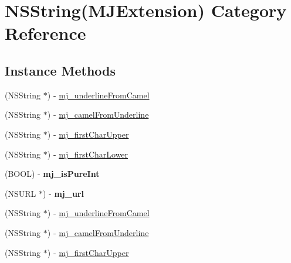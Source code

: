 \hypertarget{category_n_s_string_07_m_j_extension_08}{}\section{N\+S\+String(M\+J\+Extension) Category Reference}
\label{category_n_s_string_07_m_j_extension_08}
\subsection*{Instance Methods}
\begin{DoxyCompactItemize}
\item 
(N\+S\+String $\ast$) -\/ \mbox{\hyperlink{category_n_s_string_07_m_j_extension_08_ac826f205c48aad2a72f76041f472ec2f}{mj\+\_\+underline\+From\+Camel}}
\item 
(N\+S\+String $\ast$) -\/ \mbox{\hyperlink{category_n_s_string_07_m_j_extension_08_a6d1d7710a991b1745f21225f7beee34b}{mj\+\_\+camel\+From\+Underline}}
\item 
(N\+S\+String $\ast$) -\/ \mbox{\hyperlink{category_n_s_string_07_m_j_extension_08_af5a6d0a9c48a931b154a407715d0e4e9}{mj\+\_\+first\+Char\+Upper}}
\item 
(N\+S\+String $\ast$) -\/ \mbox{\hyperlink{category_n_s_string_07_m_j_extension_08_a4706ba52ea63138b268f17ceaee1bf38}{mj\+\_\+first\+Char\+Lower}}
\item 
\mbox{\label{category_n_s_string_07_m_j_extension_08_a3abd08e6e7a92ae537b8b10f6ebcad4c}} 
(B\+O\+OL) -\/ {\bfseries mj\+\_\+is\+Pure\+Int}
\item 
\mbox{\label{category_n_s_string_07_m_j_extension_08_a1a8cd87a9449a00dd961034ec7024154}} 
(N\+S\+U\+RL $\ast$) -\/ {\bfseries mj\+\_\+url}
\item 
(N\+S\+String $\ast$) -\/ \mbox{\hyperlink{category_n_s_string_07_m_j_extension_08_ac826f205c48aad2a72f76041f472ec2f}{mj\+\_\+underline\+From\+Camel}}
\item 
(N\+S\+String $\ast$) -\/ \mbox{\hyperlink{category_n_s_string_07_m_j_extension_08_a6d1d7710a991b1745f21225f7beee34b}{mj\+\_\+camel\+From\+Underline}}
\item 
(N\+S\+String $\ast$) -\/ \mbox{\hyperlink{category_n_s_string_07_m_j_extension_08_af5a6d0a9c48a931b154a407715d0e4e9}{mj\+\_\+first\+Char\+Upper}}
\item 

\end{DoxyCompactItemize}
